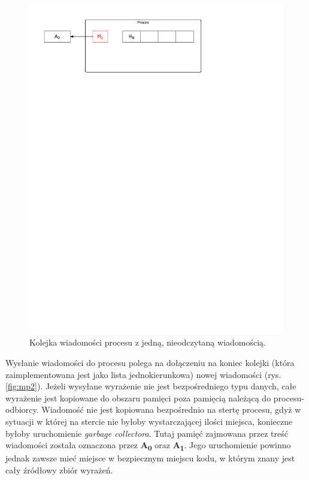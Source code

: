 \begin{figure}[h]
\centerline{\includegraphics[scale=0.75, clip, trim=10mm 220mm 68mm 10mm]{mp1}}
\caption{Kolejka wiadomości procesu z jedną, nieodczytaną wiadomością.}
\label{fig:mp1}
\end{figure}

Wysłanie wiadomości do procesu polega na dołączeniu na koniec kolejki (która zaimplementowana jest jako lista jednokierunkowa) nowej wiadomości (rys. \ref{fig:mp2}).
Jeżeli wysyłane wyrażenie nie jest bezpośredniego typu danych, całe wyrażenie jest kopiowane do obszaru pamięci poza pamięcią należącą do procesu-odbiorcy.
Wiadomość nie jest kopiowana bezpośrednio na stertę procesu, gdyż w sytuacji w której na stercie nie byłoby wystarczającej ilości miejsca, konieczne byłoby uruchomienie \emph{garbage collectora}.
Tutaj pamięć zajmowana przez treść wiadomości została oznaczona przez \textbf{A\textsubscript{0}} oraz \textbf{A\textsubscript{1}}.
Jego uruchomienie powinno jednak zawsze mieć miejsce w bezpiecznym miejscu kodu, w którym znany jest cały źródłowy zbiór wyrażeń.


